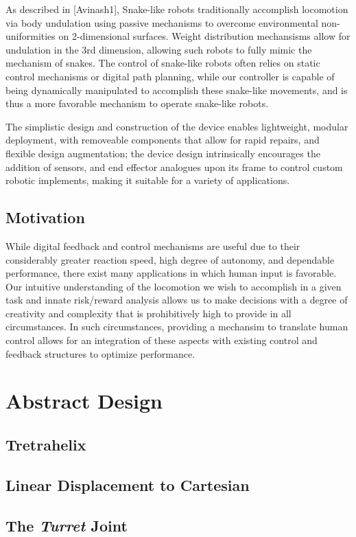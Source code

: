 \documentclass[11pt]{article}
\begin{document}
 As described in [Avinash1], Snake-like robots traditionally accomplish locomotion via body undulation using passive mechanisms to overcome environmental non-uniformities on 2-dimensional surfaces. Weight distribution mechansisms allow for undulation in the 3rd dimension, allowing  such robots to fully  mimic the mechanism of snakes. The control of snake-like robots often relies on static control mechanisms or digital path planning, while our controller is capable of being dynamically manipulated to accomplish these snake-like movements, and is thus a more favorable mechanism to operate snake-like robots.

 The simplistic design and construction of the device enables lightweight, modular deployment, with removeable components that allow for rapid repairs, and flexible design augmentation; the device design intrinsically encourages the addition of sensors, and end effector analogues upon its frame to control custom robotic implements, making it suitable for a variety of applications.


\subsection{Motivation}

While digital feedback and control mechanisms are useful due to their considerably greater reaction speed, high degree of autonomy, and dependable performance, there exist many applications in which human input is favorable. Our intuitive understanding of the locomotion we wish to accomplish in a given task and innate risk/reward analysis allows us to make decisions with a degree of creativity and complexity that is prohibitively high to provide in all circumstances. In such circumstances, providing a mechansim to translate human control allows for an integration of these aspects with existing control and feedback structures to optimize performance.
\section{Abstract Design}
\subsection{Tretrahelix}
\subsection{Linear Displacement to Cartesian}
\subsection{The \textit{Turret} Joint}
\end{document}
